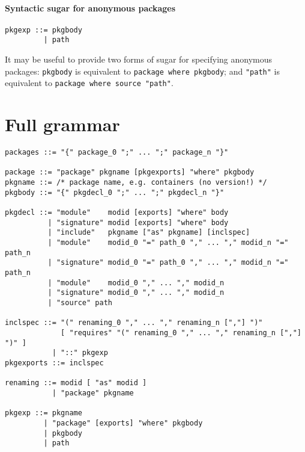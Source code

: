 \documentclass{article}
\begin{document}
\paragraph{Syntactic sugar for anonymous packages}

\begin{verbatim}
pkgexp ::= pkgbody
         | path
\end{verbatim}

It may be useful to provide two forms of sugar for specifying anonymous packages:
\verb|pkgbody| is equivalent to \verb|package where pkgbody|; and \verb|"path"|
is equivalent to \verb|package where source "path"|.

\appendix
\section{Full grammar}

\begin{verbatim}
packages ::= "{" package_0 ";" ... ";" package_n "}"

package ::= "package" pkgname [pkgexports] "where" pkgbody
pkgname ::= /* package name, e.g. containers (no version!) */
pkgbody ::= "{" pkgdecl_0 ";" ... ";" pkgdecl_n "}"

pkgdecl ::= "module"    modid [exports] "where" body
          | "signature" modid [exports] "where" body
          | "include"   pkgname ["as" pkgname] [inclspec]
          | "module"    modid_0 "=" path_0 "," ... "," modid_n "=" path_n
          | "signature" modid_0 "=" path_0 "," ... "," modid_n "=" path_n
          | "module"    modid_0 "," ... "," modid_n
          | "signature" modid_0 "," ... "," modid_n
          | "source" path

inclspec ::= "(" renaming_0 "," ... "," renaming_n [","] ")"
             [ "requires" "(" renaming_0 "," ... "," renaming_n [","] ")" ]
           | "::" pkgexp
pkgexports ::= inclspec

renaming ::= modid [ "as" modid ]
           | "package" pkgname

pkgexp ::= pkgname
         | "package" [exports] "where" pkgbody
         | pkgbody
         | path
\end{verbatim}
\end{document}
